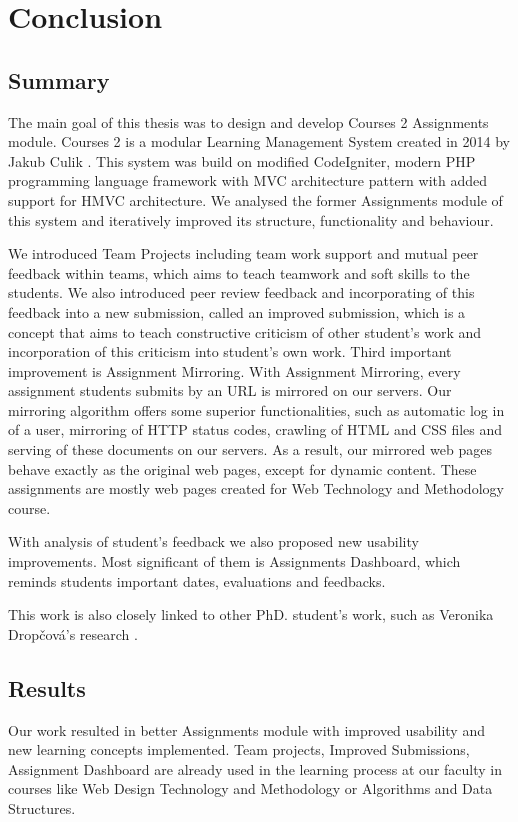 \chapter*{Conclusion}

\section*{Summary}

The main goal of this thesis was to design and develop Courses 2 Assignments module. Courses 2 is a modular Learning Management System created in 2014 by Jakub Culik \cite{culik}. This system was build on modified CodeIgniter, modern PHP programming language framework with MVC architecture pattern with added support for HMVC architecture. We analysed the former Assignments module of this system and iteratively improved its structure, functionality and behaviour.

We introduced Team Projects including team work support and mutual peer feedback within teams, which aims to teach teamwork and soft skills to the students. We also introduced peer review feedback and incorporating of this feedback into a new submission, called an improved submission, which is a concept that aims to teach constructive criticism of other student's work and incorporation of this criticism into student's own work. Third important improvement is Assignment Mirroring. With Assignment Mirroring, every assignment students submits by an URL is mirrored on our servers. Our mirroring algorithm offers some superior functionalities, such as automatic log in of a user, mirroring of HTTP status codes, crawling of HTML and CSS files and serving of these documents on our servers. As a result, our mirrored web pages behave exactly as the original web pages, except for dynamic content. These assignments are mostly web pages created for Web Technology and Methodology course.

With analysis of student's feedback we also proposed new usability improvements. Most significant of them is Assignments Dashboard, which reminds students important dates, evaluations and feedbacks.

This work is also closely linked to other PhD. student's work, such as Veronika Drop\v{c}ov\'{a}'s research \cite{dropcova}.

\section*{Results}
Our work resulted in better Assignments module with improved usability and new learning concepts implemented. Team projects, Improved Submissions, Assignment Dashboard are already used in the learning process at our faculty in courses like Web Design Technology and Methodology or Algorithms and Data Structures.

